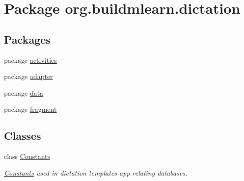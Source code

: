 \hypertarget{namespaceorg_1_1buildmlearn_1_1dictation}{}\section{Package org.\+buildmlearn.\+dictation}
\label{namespaceorg_1_1buildmlearn_1_1dictation}
\subsection*{Packages}
\begin{DoxyCompactItemize}
\item 
package \hyperlink{namespaceorg_1_1buildmlearn_1_1dictation_1_1activities}{activities}
\item 
package \hyperlink{namespaceorg_1_1buildmlearn_1_1dictation_1_1adapter}{adapter}
\item 
package \hyperlink{namespaceorg_1_1buildmlearn_1_1dictation_1_1data}{data}
\item 
package \hyperlink{namespaceorg_1_1buildmlearn_1_1dictation_1_1fragment}{fragment}
\end{DoxyCompactItemize}
\subsection*{Classes}
\begin{DoxyCompactItemize}
\item 
class \hyperlink{classorg_1_1buildmlearn_1_1dictation_1_1Constants}{Constants}
\begin{DoxyCompactList}\small\item\em \hyperlink{classorg_1_1buildmlearn_1_1dictation_1_1Constants}{Constants} used in dictation template\textquotesingle{}s app relating databases. \end{DoxyCompactList}\end{DoxyCompactItemize}
